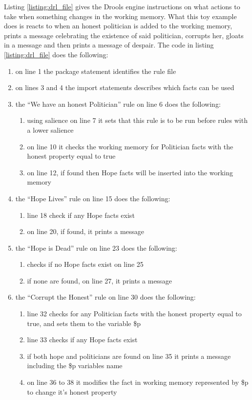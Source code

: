 Listing \ref{listing:drl_file} gives the Drools engine instructions on what actions to take when something changes in the working memory.
What this toy example does is reacts to when an honest politician is added to the working memory, prints a message celebrating the existence of said politician, corrupts her, gloats in a message and then prints a message of despair.
The code in listing \ref{listing:drl_file} does the following: 
\begin{enumerate}[topsep=2pt,itemsep=2pt,partopsep=2pt, parsep=2pt]
    \item on line 1 the package statement identifies the rule file
    \item on lines 3 and 4 the import statements describes which facts can be used
    \item the ``We have an honest Politician'' rule on line 6 does the following:
    \begin{enumerate}[topsep=2pt,itemsep=2pt,partopsep=2pt, parsep=2pt]
        \item using salience on line 7 it sets that this rule is to be run before rules with a lower salience
        \item on line 10 it checks the working memory for Politician facts with the honest property equal to true
        \item on line 12, if found then Hope facts will be inserted into the working memory
    \end{enumerate}
    \item the ``Hope Lives'' rule on line 15 does the following:
    \begin{enumerate}[topsep=2pt,itemsep=2pt,partopsep=2pt, parsep=2pt]
        \item line 18 check if any Hope facts exist
        \item on line 20, if found, it prints a message
    \end{enumerate}
    \item the ``Hope is Dead'' rule on line 23 does the following:
    \begin{enumerate}[topsep=2pt,itemsep=2pt,partopsep=2pt, parsep=2pt]
        \item checks if no Hope facts exist on line 25
        \item if none are found, on line 27, it prints a message 
    \end{enumerate}
    \item the ``Corrupt the Honest'' rule on line 30 does the following:
    \begin{enumerate}[topsep=2pt,itemsep=2pt,partopsep=2pt, parsep=2pt]
        \item line 32 checks for any Politician facts with the honest property equal to true, and sets them to the variable \$p
        \item line 33 checks if any Hope facts exist
        \item if both hope and politicians are found on line 35 it prints a message including the \$p variables name
        \item on line 36 to 38 it modifies the fact in working memory represented by \$p to change it's honest property 
    \end{enumerate}
\end{enumerate}